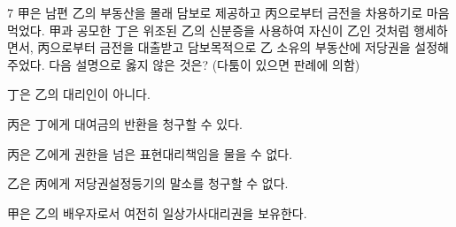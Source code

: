 \begin{question}{7}
甲은 남편 乙의 부동산을 몰래 담보로 제공하고 丙으로부터 금전을 차용하기로 마음먹었다. 甲과 공모한 丁은 위조된 乙의 신분증을 사용하여 자신이 乙인 것처럼 행세하면서, 丙으로부터 금전을 대출받고 담보목적으로 乙 소유의 부동산에 저당권을 설정해 주었다. 다음 설명으로 옳지 않은 것은? (다툼이 있으면 판례에 의함)
\begin{choices}
  \item 丁은 乙의 대리인이 아니다.
  \item 丙은 丁에게 대여금의 반환을 청구할 수 있다.
  \item 丙은 乙에게 권한을 넘은 표현대리책임을 물을 수 없다.
  \item 乙은 丙에게 저당권설정등기의 말소를 청구할 수 없다.
  \item 甲은 乙의 배우자로서 여전히 일상가사대리권을 보유한다.
\end{choices}
\end{question}

